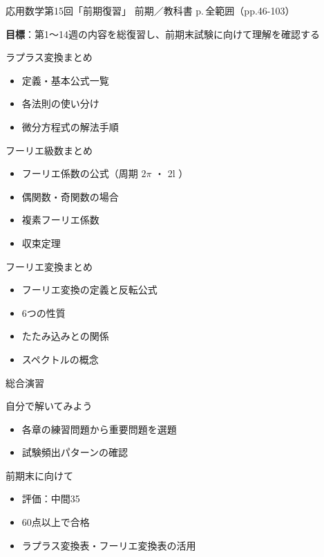 \documentclass[aspectratio=43,professionalfonts,handout]{beamer}
\newcommand{\LectureNum}{15}
\newcommand{\LectureTitle}{前期復習}
\newcommand{\TextPages}{p.\,全範囲（pp.46-103）}
\newcommand{\CourseName}{応用数学}
\renewcommand{\TermName}{前期}
\begin{document}
\begin{frame}{\CourseName\quad 第\LectureNum 回「\LectureTitle」}
  {\small \TermName\quad \TeacherName\quad ／\quad 教科書 \TextPages}

  \textbf{目標}：第1〜14週の内容を総復習し、前期末試験に向けて理解を確認する

\end{frame}

\begin{frame}{ラプラス変換まとめ}
  \begin{block}{}
  \begin{itemize}
    \item 定義・基本公式一覧
    \item 各法則の使い分け
    \item 微分方程式の解法手順
  \end{itemize}
  \end{block}
\end{frame}

\begin{frame}{フーリエ級数まとめ}
  \begin{block}{}
  \begin{itemize}
    \item フーリエ係数の公式（周期 $2\pi$ ・ 2l ）
    \item 偶関数・奇関数の場合
    \item 複素フーリエ係数
    \item 収束定理
  \end{itemize}
  \end{block}
\end{frame}

\begin{frame}{フーリエ変換まとめ}
  \begin{block}{}
  \begin{itemize}
    \item フーリエ変換の定義と反転公式
    \item 6つの性質
    \item たたみ込みとの関係
    \item スペクトルの概念
  \end{itemize}
  \end{block}
\end{frame}

\begin{frame}{総合演習}
  \begin{exampleblock}{自分で解いてみよう}
  \begin{itemize}
    \item 各章の練習問題から重要問題を選題
    \item 試験頻出パターンの確認
  \end{itemize}
  \end{exampleblock}
\end{frame}

\begin{frame}{前期末に向けて}
  \begin{itemize}
    \item 評価：中間35%
    \item 60点以上で合格
    \item ラプラス変換表・フーリエ変換表の活用
  \end{itemize}
\end{frame}
\end{document}
